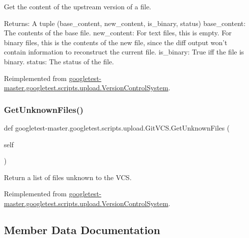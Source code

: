 \begin{DoxyVerb}Get the content of the upstream version of a file.

Returns:
  A tuple (base_content, new_content, is_binary, status)
base_content: The contents of the base file.
new_content: For text files, this is empty.  For binary files, this is
  the contents of the new file, since the diff output won't contain
  information to reconstruct the current file.
is_binary: True iff the file is binary.
status: The status of the file.
\end{DoxyVerb}
 

Reimplemented from \mbox{\hyperlink{classgoogletest-master_1_1googletest_1_1scripts_1_1upload_1_1_version_control_system_adfc913d49e48291939a9de8476a4c993}{googletest-\/master.\+googletest.\+scripts.\+upload.\+Version\+Control\+System}}.

\mbox{\label{classgoogletest-master_1_1googletest_1_1scripts_1_1upload_1_1_git_v_c_s_afa90a5cfd1b4f217422384f4e1d3b004}} 
\subsubsection{\texorpdfstring{GetUnknownFiles()}{GetUnknownFiles()}}
{\footnotesize\ttfamily def googletest-\/master.\+googletest.\+scripts.\+upload.\+Git\+V\+C\+S.\+Get\+Unknown\+Files (\begin{DoxyParamCaption}\item[{}]{self }\end{DoxyParamCaption})}

\begin{DoxyVerb}Return a list of files unknown to the VCS.\end{DoxyVerb}
 

Reimplemented from \mbox{\hyperlink{classgoogletest-master_1_1googletest_1_1scripts_1_1upload_1_1_version_control_system_aef7e59b815e037806eb11d94ed512ba6}{googletest-\/master.\+googletest.\+scripts.\+upload.\+Version\+Control\+System}}.



\subsection{Member Data Documentation}
\mbox{\label{classgoogletest-master_1_1googletest_1_1scripts_1_1upload_1_1_git_v_c_s_a1f98db3073e5ef9096b2da85aa86fa34}} 
